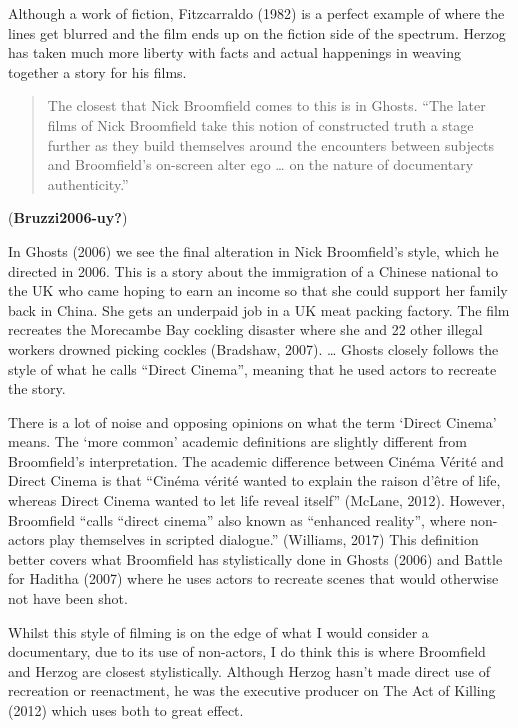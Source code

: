 \documentclass[
  12pt,
]{book}
\begin{document}
Although a work of fiction, Fitzcarraldo (1982) is a perfect example of where the lines get blurred and the film ends up on the fiction side of the spectrum. Herzog has taken much more liberty with facts and actual happenings in weaving together a story for his films.

\begin{quote}
The closest that Nick Broomfield comes to this is in Ghosts. “The later films of Nick Broomfield take this notion of constructed truth a stage further as they build themselves around the encounters between subjects and Broomfield’s on-screen alter ego … on the nature of documentary authenticity.”     
\end{quote}

(\textbf{Bruzzi2006-uy?})

In Ghosts (2006) we see the final alteration in Nick Broomfield's style, which he directed in 2006. This is a story about the immigration of a Chinese national to the UK who came hoping to earn an income so that she could support her family back in China. She gets an underpaid job in a UK meat packing factory. The film recreates the Morecambe Bay cockling disaster where she and 22 other illegal workers drowned picking cockles (Bradshaw, 2007). \ldots{} Ghosts closely follows the style of what he calls ``Direct Cinema'', meaning that he used actors to recreate the story.

There is a lot of noise and opposing opinions on what the term `Direct Cinema' means. The `more common' academic definitions are slightly different from Broomfield's interpretation. The academic difference between Cinéma Vérité and Direct Cinema is that ``Cinéma vérité wanted to explain the raison d'être of life, whereas Direct Cinema wanted to let life reveal itself'' (McLane, 2012). However, Broomfield ``calls ``direct cinema'' also known as ``enhanced reality'', where non-actors play themselves in scripted dialogue.'' (Williams, 2017) This definition better covers what Broomfield has stylistically done in Ghosts (2006) and Battle for Haditha (2007) where he uses actors to recreate scenes that would otherwise not have been shot.

Whilst this style of filming is on the edge of what I would consider a documentary, due to its use of non-actors, I do think this is where Broomfield and Herzog are closest stylistically. Although Herzog hasn't made direct use of recreation or reenactment, he was the executive producer on The Act of Killing (2012) which uses both to great effect.
\end{document}
